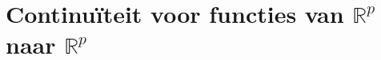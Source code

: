 \documentclass[main.tex]{subfiles}
\begin{document}
\chapter{Continu\"iteit voor functies van $\mathbb{R}^{p}$ naar $\mathbb{R}^{p}$}
\label{cha:cont-in-r}




\end{document}
